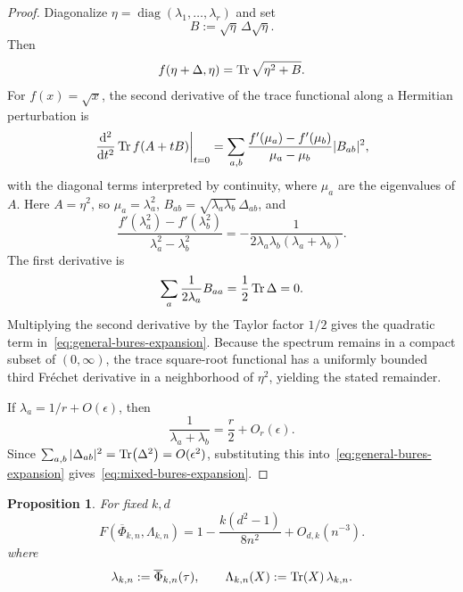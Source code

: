 \documentclass[11pt,letterpaper]{article}
\theoremstyle{plain}
\theoremstyle{plain}
\theoremstyle{plain}
\theoremstyle{plain}
\theoremstyle{plain}
\theoremstyle{plain}
\theoremstyle{plain}
\newtheorem{smproposition}[smtheorem]{Proposition}
\theoremstyle{definition}
\theoremstyle{plain}
\begin{document}
\begin{proof}
Diagonalize $\eta=\operatorname{diag}(\lambda_1,\ldots,\lambda_r)$ and set
\[
  B:=\sqrt\eta\,\Delta\sqrt\eta.
\]
Then
\[
  f(\eta+\Delta,\eta)
  =\Tr\sqrt{\eta^2+B}.
\]
For $f(x)=\sqrt x$, the second derivative of the trace functional along a Hermitian perturbation is
\[
  \left.\frac{\dd^2}{\dd t^2}\Tr f(A+tB)\right|_{t=0}
  =\sum_{a,b}
  \frac{f'(\mu_a)-f'(\mu_b)}{\mu_a-\mu_b}|B_{ab}|^2,
\]
with the diagonal terms interpreted by continuity, where $\mu_a$ are the eigenvalues of $A$. 
Here $A=\eta^2$, so $\mu_a=\lambda_a^2$, $B_{ab}=\sqrt{\lambda_a\lambda_b}\,\Delta_{ab}$, and
\[
  \frac{f'(\lambda_a^2)-f'(\lambda_b^2)}
       {\lambda_a^2-\lambda_b^2}
  =-\frac1{2\lambda_a\lambda_b(\lambda_a+\lambda_b)}.
\]
The first derivative is
\[
  \sum_a\frac1{2\lambda_a}B_{aa}
  =\frac12\Tr\Delta=0.
\]
Multiplying the second derivative by the Taylor factor $1/2$ gives the quadratic term in~\eqref{eq:general-bures-expansion}. 
Because the spectrum remains in a compact subset of $(0,\infty)$, the trace square-root functional has a uniformly bounded third Fr\'echet derivative in a neighborhood of $\eta^2$, 
yielding the stated remainder.

If $\lambda_a=1/r+O(\epsilon)$, then
\[
  \frac1{\lambda_a+\lambda_b}=\frac r2+O_r(\epsilon).
\]
Since $\sum_{a,b}|\Delta_{ab}|^2=\Tr(\Delta^2)=O(\epsilon^2)$, substituting this into~\eqref{eq:general-bures-expansion} gives~\eqref{eq:mixed-bures-expansion}.
\end{proof}

\begin{smproposition}\label{prop:k-loc_fidelity}
For fixed $k, d$
\begin{equation}
\label{eq:mean-fidelity}
  F(\overline\Phi_{k,n},\Lambda_{k,n})
  =1-\frac{k(d^2-1)}{8n^2}+O_{d,k}(n^{-3}).
\end{equation}
where 
\begin{equation}
\label{eq:lambda-kn}
  \lambda_{k,n}:=\overline\Phi_{k,n}(\tau),
  \qquad
  \Lambda_{k,n}(X):=\Tr(X)\,\lambda_{k,n}.
\end{equation}
\end{smproposition}
\end{document}
